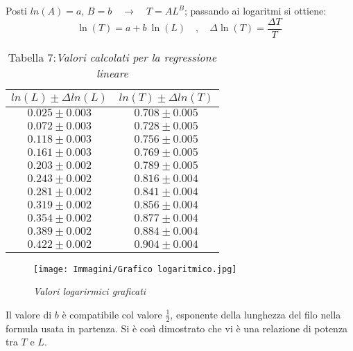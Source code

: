 \documentclass[12pt, a4paper]{article}
\begin{document}
Posti $ln(A) = a$, $B = b \quad \xrightarrow{} \quad T = A L^B$;
passando ai logaritmi si ottiene:
\begin{equation*}
    \ln{(T)}=a +b\ \ln{(L)} \quad , \quad     \Delta\ln{(T)}=\frac{\Delta T}{T}\ 
\end{equation*}



\begin{table}[h!]
    \centering
    \begin{tabular}{|c|c|}
    \hline
    $ln(L) \pm \Delta ln(L) $ & $ln(T) \pm \Delta ln(T) $  \\  
    \hline
    $ 0.025 \pm 0.003$ & $ 0.708\pm 0.005$ \\
    $ 0.072 \pm 0.003$ & $ 0.728\pm 0.005$ \\
    $ 0.118 \pm 0.003$ & $ 0.756\pm 0.005$ \\
    $ 0.161 \pm 0.003$ & $ 0.769\pm 0.005$ \\
    $ 0.203 \pm 0.002$ & $ 0.789\pm 0.005$ \\
    $ 0.243 \pm 0.002$ & $ 0.816\pm 0.004$ \\
    $ 0.281 \pm 0.002$ & $ 0.841\pm 0.004$ \\
    $ 0.319 \pm 0.002$ & $ 0.856\pm 0.004$ \\
    $ 0.354 \pm 0.002$ & $ 0.877\pm 0.004$ \\
    $ 0.389 \pm 0.002$ & $ 0.884\pm 0.004$ \\
    $ 0.422 \pm 0.002$ & $ 0.904\pm 0.004$ \\
    \hline
    \end{tabular}
    \caption*{\centering Tabella 7:\small{\textit{Valori calcolati per la regressione lineare}}}
    \label{tab:my_label}
\end{table}


\smallskip
\begin{figure}[h!]
    \centering
    \texttt{[image: Immagini/Grafico logaritmico.jpg]}
    \caption{\textit{{\footnotesize{Valori logarirmici graficati}}}}
    \label{IndipendenzaTM}
\end{figure}

Il valore di $b$ è compatibile col valore $\frac{1}{2}$, esponente della lunghezza del filo nella formula usata in partenza.  Si è così dimostrato che vi è una relazione di potenza tra $T$ e $L$.







\newpage
\end{document}
